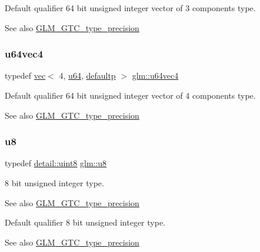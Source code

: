 Default qualifier 64 bit unsigned integer vector of 3 components type. \begin{DoxySeeAlso}{See also}
\mbox{\hyperlink{group__gtc__type__precision}{G\+L\+M\+\_\+\+G\+T\+C\+\_\+type\+\_\+precision}} 
\end{DoxySeeAlso}
\mbox{\label{group__gtc__type__precision_ga70396c4f422824503c870db50b3059fd}} 
\subsubsection{\texorpdfstring{u64vec4}{u64vec4}}
{\footnotesize\ttfamily typedef \mbox{\hyperlink{structglm_1_1vec}{vec}}$<$ 4, \mbox{\hyperlink{group__gtc__type__precision_ga71cedd4972f9cb1a5e14dfe5ab83ecd7}{u64}}, \mbox{\hyperlink{namespaceglm_a36ed105b07c7746804d7fdc7cc90ff25a9d21ccd8b5a009ec7eb7677befc3bf51}{defaultp}} $>$ \mbox{\hyperlink{group__gtc__type__precision_ga70396c4f422824503c870db50b3059fd}{glm\+::u64vec4}}}

Default qualifier 64 bit unsigned integer vector of 4 components type. \begin{DoxySeeAlso}{See also}
\mbox{\hyperlink{group__gtc__type__precision}{G\+L\+M\+\_\+\+G\+T\+C\+\_\+type\+\_\+precision}} 
\end{DoxySeeAlso}
\mbox{\label{group__gtc__type__precision_ga5e3dc67373d5068997d2d9f41c9024d2}} 
\subsubsection{\texorpdfstring{u8}{u8}}
{\footnotesize\ttfamily typedef \mbox{\hyperlink{namespaceglm_1_1detail_aef2588f97d090cc19fbbe0c74fe17c8f}{detail\+::uint8}} \mbox{\hyperlink{group__gtc__type__precision_ga5e3dc67373d5068997d2d9f41c9024d2}{glm\+::u8}}}

8 bit unsigned integer type. \begin{DoxySeeAlso}{See also}
\mbox{\hyperlink{group__gtc__type__precision}{G\+L\+M\+\_\+\+G\+T\+C\+\_\+type\+\_\+precision}}
\end{DoxySeeAlso}
Default qualifier 8 bit unsigned integer type. \begin{DoxySeeAlso}{See also}
\mbox{\hyperlink{group__gtc__type__precision}{G\+L\+M\+\_\+\+G\+T\+C\+\_\+type\+\_\+precision}} 
\end{DoxySeeAlso}
\mbox{\label{group__gtc__type__precision_ga5b0875b5979b80a0ccb371bf7f0f95d8}} 

